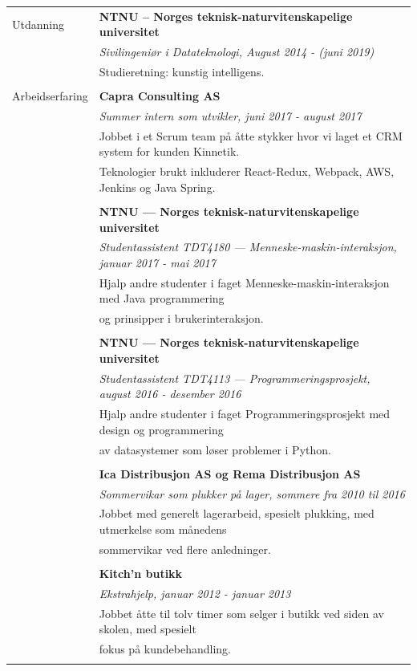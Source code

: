 \documentclass[letterpaper,11pt,oneside]{article}
\begin{document}
\noindent \begin{longtable}{@{} l l}
  \Large{Utdanning} & \textbf{NTNU – Norges teknisk-naturvitenskapelige universitet} \\
  & \textit{Sivilingeniør i Datateknologi, August 2014 - (juni 2019)}\\
     & Studieretning: kunstig intelligens.\\
     & \\
     \Large{Arbeidserfaring} & \textbf{Capra Consulting AS} \\
     & \textit{Summer intern som utvikler, juni 2017 - august 2017} \\
     & Jobbet i et Scrum team på åtte stykker hvor vi laget et CRM system for kunden Kinnetik.\\
     & Teknologier brukt inkluderer React-Redux, Webpack, AWS, Jenkins og Java Spring.\\
     & \\
     & \textbf{NTNU --- Norges teknisk-naturvitenskapelige universitet} \\
     & \textit{Studentassistent TDT4180 --- Menneske-maskin-interaksjon, januar 2017 - mai 2017}\\
     & Hjalp andre studenter i faget Menneske-maskin-interaksjon med Java programmering \\
     & og prinsipper i brukerinteraksjon.\\
     & \\
     & \textbf{NTNU --- Norges teknisk-naturvitenskapelige universitet} \\
     & \textit{Studentassistent TDT4113 --- Programmeringsprosjekt, august 2016 - desember 2016}\\
     & Hjalp andre studenter i faget Programmeringsprosjekt med design og programmering \\
     & av datasystemer som løser problemer i Python.\\
     & \\
     & \textbf{Ica Distribusjon AS og Rema Distribusjon AS} \\
     & \textit{Sommervikar som plukker på lager, sommere fra 2010 til 2016}\\
     & Jobbet med generelt lagerarbeid, spesielt plukking, med utmerkelse som månedens \\
     & sommervikar ved flere anledninger.\\
     & \\
     & \textbf{Kitch'n butikk} \\
     & \textit{Ekstrahjelp, januar 2012 - januar 2013}\\
     & Jobbet åtte til tolv timer som selger i butikk ved siden av skolen, med spesielt \\
     & fokus på kundebehandling.\\
     & \\


\end{longtable}
\end{document}
